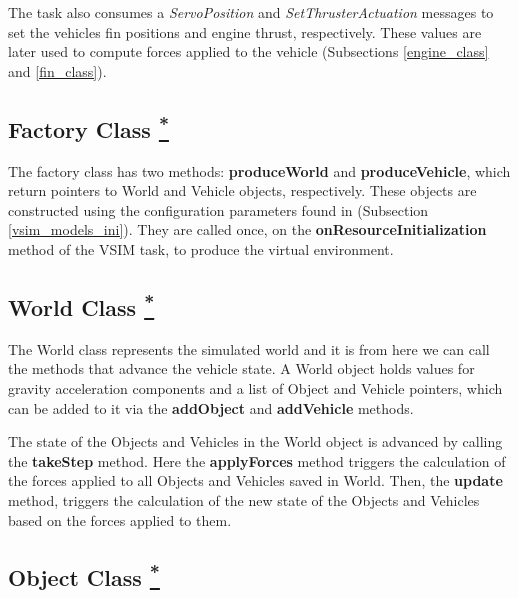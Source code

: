 \documentclass[10pt,a4paper]{article}
\begin{document}
\par The task also consumes a \textit{ServoPosition} and \textit{SetThrusterActuation} messages to set the vehicles fin positions and engine thrust, respectively. These values are later used to compute forces applied to the vehicle (Subsections \ref{engine_class} and \ref{fin_class}).


\subsection{Factory Class \href{https://www.lsts.pt/docs/dune/dune-2017.01.0-dmsmw/db/d0e/classSimulators_1_1VSIM_1_1Factory.html}{\textsuperscript{*}}}
\label{factory_class}

\par The factory class has two methods: \textbf{produceWorld} and \textbf{produceVehicle}, which return pointers to World and Vehicle objects, respectively. These objects are constructed using the configuration parameters found in  (Subsection \ref{vsim_models_ini}). They are called once, on the \textbf{onResourceInitialization} method of the VSIM task, to produce the virtual environment.

\subsection{World Class \href{https://www.lsts.pt/docs/dune/dune-2017.01.0-dmsmw/d9/d88/classSimulators_1_1VSIM_1_1World.html}{\textsuperscript{*}}}
\label{world_class}

\par The World class represents the simulated world and it is from here we can call the methods that advance the vehicle state. A World object holds values for gravity acceleration components and a list of Object and Vehicle pointers, which can be added to it via the \textbf{addObject} and \textbf{addVehicle} methods.

\par The state of the Objects and Vehicles in the World object is advanced by calling the \textbf{takeStep} method. Here the \textbf{applyForces} method triggers the calculation of the forces applied to all Objects and Vehicles saved in World. Then, the \textbf{update} method, triggers the calculation of the new state of the Objects and Vehicles based on the forces applied to them. 

\subsection{Object Class \href{https://www.lsts.pt/docs/dune/dune-2017.01.0-dmsmw/d3/dd8/classSimulators_1_1VSIM_1_1Object.html}{\textsuperscript{*}}}
\label{object_class}
\end{document}
